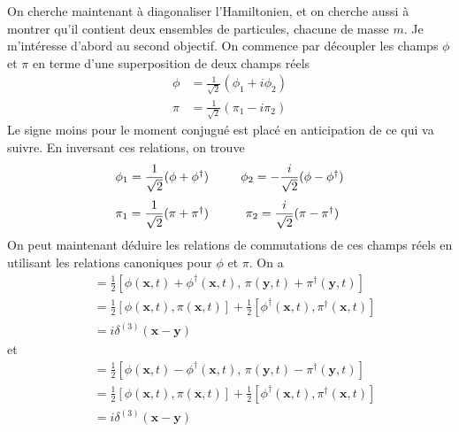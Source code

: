 \documentclass{article}
\numberwithin{equation}{section}
\begin{document}
On cherche maintenant à diagonaliser l'Hamiltonien, et on cherche aussi à montrer qu'il contient deux ensembles de particules, chacune de masse $m$.  
Je m'intéresse d'abord au second objectif.
On commence par découpler les champs $\phi$ et $\pi$ en 
terme d'une superposition de deux champs réels
\begin{align}
        \phi &= \frac{1}{\sqrt{2}}(\phi_1 + i\phi_2) \\
        \pi &= \frac{1}{\sqrt{2}}(\pi_1 - i \pi_2)
\end{align}
Le signe moins pour le moment conjugué est placé en anticipation de ce qui va suivre.
En inversant ces relations,  on trouve
\begin{equation}
        \begin{matrix}
                \phi_1 = \dfrac{1}{\sqrt{2}}(\phi + \phi^{\dagger})\, &\hspace{.5cm} \phi_2 = -\dfrac{i}{\sqrt{2}}(\phi - \phi^{\dagger}) \\[3ex]
                \pi_1 = \dfrac{1}{\sqrt{2}}(\pi + \pi^{\dagger})\, &\hspace{.5cm} \pi_2 = \dfrac{i}{\sqrt{2}}(\pi - \pi^{\dagger})
        \end{matrix}
\end{equation} 
On peut maintenant déduire les relations de commutations de ces champs réels en utilisant les relations canoniques pour $\phi$ et $\pi$. On a
\begin{align*}
        [\phi_1(\mathbf{x}, t), \pi_1(\mathbf{y}, t)] &= \frac{1}{2}[\phi(\mathbf{x}, t) + \phi^{\dagger}(\mathbf{x}, t),\, \pi(\mathbf{y}, t) + \pi^{\dagger}(\mathbf{y}, t)] \\
                        &= \frac{1}{2}[\phi(\mathbf{x}, t), \pi(\mathbf{x}, t)] + \frac{1}{2}[\phi^{\dagger}(\mathbf{x}, t), \pi^{\dagger}(\mathbf{x}, t)] \\
                        &= i \delta^{(3)}(\mathbf{x} - \mathbf{y})
\end{align*}
et
\begin{align*}
        [\phi_2(\mathbf{x}, t), \pi_2(\mathbf{y}, t)] &= \frac{1}{2}[\phi(\mathbf{x}, t) - \phi^{\dagger}(\mathbf{x}, t),\, \pi(\mathbf{y}, t) - \pi^{\dagger}(\mathbf{y}, t)] \\
                        &= \frac{1}{2}[\phi(\mathbf{x}, t), \pi(\mathbf{x}, t)] + \frac{1}{2}[\phi^{\dagger}(\mathbf{x}, t), \pi^{\dagger}(\mathbf{x}, t)] \\
                        &= i \delta^{(3)}(\mathbf{x} - \mathbf{y})
\end{align*}
\end{document}
